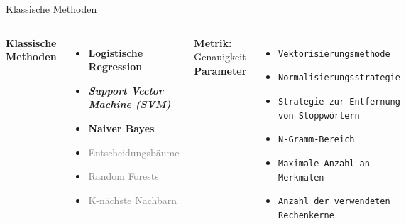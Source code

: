 \documentclass[aspectratio=169]{beamer} %
\begin{document}
\begin{frame}{Klassische Methoden}
  \fontsize{10pt}{12pt}\selectfont
  \vspace{0.3cm}

  \begin{columns}
      \textbf{Klassische Methoden}
      \vspace{0.3cm}
      \begin{itemize}
          \item \textbf{Logistische Regression}
          \item \textbf{\textit{Support Vector Machine (SVM)}}
          \item \textbf{Naiver Bayes}
          \item \textcolor{gray}{Entscheidungsbäume}
          \item \textcolor{gray}{Random Forests}
          \item \textcolor{gray}{K-nächste Nachbarn}
      \end{itemize}
      \vspace{0.5cm}
  \textbf{Metrik:} Genauigkeit
    \vspace{-0.5cm}
      \textbf{Parameter}
      \vspace{0.3cm}
      \begin{itemize}
    \item \texttt{Vektorisierungsmethode}
    \item \texttt{Normalisierungsstrategie}
    \item \texttt{Strategie zur Entfernung von Stoppwörtern}
    \item \texttt{N-Gramm-Bereich}
    \item \texttt{Maximale Anzahl an Merkmalen}
    \item \texttt{Anzahl der verwendeten Rechenkerne}
\end{itemize}
  \end{columns}
\end{frame}

\end{document}
